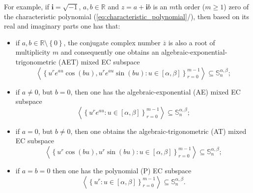 \documentclass[b5paper, twosided]{book}
\DeclareRobustCommand{\mref}[1]{\ref{#1}{\relsize{-1}/\pageref{#1}}}
\begin{document}
For example, if $\mathbf{i}=\sqrt{-1}$, $a, b \in \mathbb{R}$ and $z=a+\mathbf{i}b$ is an $m$th order ($m\geq 1$) zero of the characteristic polynomial (\mref{eq:characteristic_polynomial}), then based on its real and imaginary parts one has that:
\begin{itemize}
    \item
    if $a,b\in\mathbb{R}\setminus\left\{0\right\}$, the conjugate complex number $\overline{z}$ is also a root of multiplicity $m$ and consequently one obtains an algebraic-exponential-trigonometric (AET) mixed EC subspace
    \begin{equation}
    \label{eq:AET}
    \left\langle
    \left\{
    u^r e^{au} \cos\left(bu\right),
    u^r e^{au} \sin\left(bu\right):
    u \in \left[\alpha,\beta\right]
    \right\}_{r=0}^{m-1}
    \right\rangle \subseteq \mathbb{S}_n^{\alpha,\beta};
    \end{equation}
    \item
    if $a \neq 0$, but $b=0$, then one has the
    algebraic-exponential (AE) mixed EC subspace
    \begin{equation}
    \label{eq:AE}
    \left\langle
    \left\{
    u^r e^{au} : u \in \left[\alpha,\beta\right]
    \right\}_{r=0}^{m-1}
    \right\rangle \subseteq \mathbb{S}_n^{\alpha,\beta};
    \end{equation}
    \item
    if $a = 0$, but $b \neq 0$, then one obtains the algebraic-trigonometric (AT) mixed EC subspace
    \begin{equation}
    \label{eq:AT}
    \left\langle
    \left\{
    u^r \cos\left(bu\right),
    u^r \sin\left(bu\right):
    u \in \left[\alpha,\beta\right]
    \right\}_{r=0}^{m-1}
    \right\rangle \subseteq \mathbb{S}_n^{\alpha,\beta};
    \end{equation}
    \item
    if $a=b=0$ then one has the polynomial (P) EC subspace
    \begin{equation}
    \label{eq:P}	
    \left\langle
    \left\{
    u^r : u \in \left[\alpha,\beta\right]
    \right\}_{r=0}^{m-1}
    \right\rangle \subseteq \mathbb{S}_n^{\alpha,\beta}.
    \end{equation}
\end{itemize}
\end{document}
